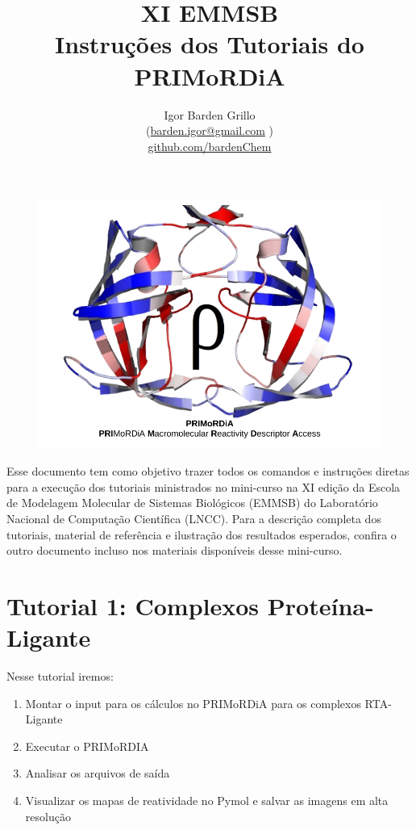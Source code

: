 \documentclass[a4paper,11pt]{refart}
\title{ \huge {XI EMMSB }\\
		Instruções dos Tutoriais do PRIMoRDiA }
\author{Igor Barden Grillo \\(\url{barden.igor@gmail.com} )\\\url{github.com/bardenChem}}
\begin{document}
	\maketitle
	
	
	\hspace*{-1.2\leftmarginwidth}
	\begin{minipage}{\fullwidth}
		\begin{figure}[H]
			\begin{center}
				\includegraphics[width=7in]{logo_primordia}
			\end{center}
		\end{figure}	
	\end{minipage}	
	\newpage
	
	\newpage
	
	Esse documento tem como objetivo trazer todos os comandos e instruções diretas para a execução dos tutoriais ministrados no mini-curso na XI edição da Escola de Modelagem Molecular de Sistemas Biológicos (EMMSB) do Laboratório Nacional de Computação Científica (LNCC). Para a descrição completa dos tutoriais, material de referência e ilustração dos resultados esperados, confira o outro documento incluso nos materiais disponíveis desse mini-curso.
	
		
		
	\section{Tutorial 1: Complexos Proteína-Ligante}
	
	Nesse tutorial iremos:
	
	\begin{enumerate}
		\item Montar o input para os cálculos no PRIMoRDiA para os complexos RTA-Ligante
		\item Executar o PRIMoRDIA 
		\item Analisar os arquivos de saída
		\item Visualizar os mapas de reatividade no Pymol e salvar as imagens em alta resolução
	\end{enumerate}
\end{document}
